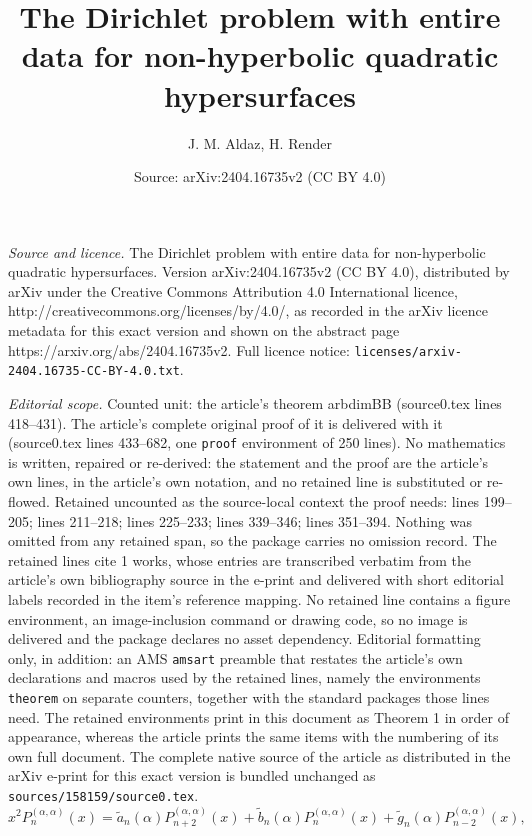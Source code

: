 \documentclass[10pt,a4paper]{amsart}
\title{The Dirichlet problem with entire data for non-hyperbolic quadratic hypersurfaces}
\author{J. M. Aldaz, H. Render}
\date{Source: arXiv:2404.16735v2 (CC BY 4.0)}
\begin{document}
\maketitle

\noindent\emph{Source and licence.} The Dirichlet problem with entire data for non-hyperbolic quadratic hypersurfaces. Version arXiv:2404.16735v2 (CC BY 4.0), distributed by arXiv under the Creative Commons Attribution 4.0 International licence, http://creativecommons.org/licenses/by/4.0/, as recorded in the arXiv licence metadata for this exact version and shown on the abstract page https://arxiv.org/abs/2404.16735v2. Full licence notice: \texttt{licenses/arxiv-2404.16735-CC-BY-4.0.txt}.\par\smallskip

\noindent\textit{Editorial scope.} Counted unit: the article's theorem arbdimBB (source0.tex lines 418--431). The article's complete original proof of it is delivered with it (source0.tex lines 433--682, one \texttt{proof} environment of 250 lines). No mathematics is written, repaired or re-derived: the statement and the proof are the article's own lines, in the article's own notation, and no retained line is substituted or re-flowed.  Retained uncounted as the source-local context the proof needs: lines 199--205; lines 211--218; lines 225--233; lines 339--346; lines 351--394.  Nothing was omitted from any retained span, so the package carries no omission record.  The retained lines cite 1 works, whose entries are transcribed verbatim from the article's own bibliography source in the e-print and delivered with short editorial labels recorded in the item's reference mapping.  No retained line contains a figure environment, an image-inclusion command or drawing code, so no image is delivered and the package declares no asset dependency.  Editorial formatting only, in addition: an AMS \texttt{amsart} preamble that restates the article's own declarations and macros used by the retained lines, namely the environments \texttt{theorem} on separate counters, together with the standard packages those lines need.  The retained environments print in this document as Theorem 1 in order of appearance, whereas the article prints the same items with the numbering of its own full document.  The complete native source of the article as distributed in the arXiv e-print for this exact version is bundled unchanged as \texttt{sources/158159/source0.tex}.
\begin{equation}
x^{2}P_{n}^{\left( \alpha ,\alpha \right) }\left( x\right) =\widetilde{a}%
_{n}\left( \alpha \right) P_{n+2}^{\left( \alpha ,\alpha \right) }\left(
x\right) +\widetilde{b}_{n}\left( \alpha \right) P_{n}^{\left( \alpha
,\alpha \right) }\left( x\right) +\widetilde{g}_{n}\left( \alpha \right)
P_{n-2}^{\left( \alpha ,\alpha \right) }\left( x\right),  \label{eqrec2}
\end{equation}%
\end{document}
